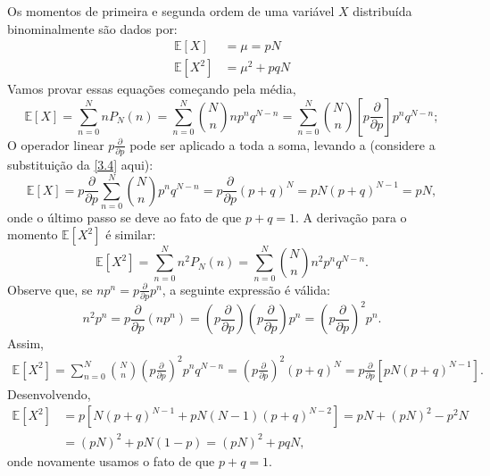 Os momentos de primeira e segunda ordem de uma variável $X$ distribuída binominalmente são dados por:
\begin{subequations}\label{3.6}
\begin{align}
\mathbb{E}[X] &= \mu = pN \label{3.6a}\\
\mathbb{E}[X^2] &= \mu^2 + pqN 
\end{align}
\end{subequations}
Vamos provar essas equações começando pela média,
\begin{equation*}
\mathbb{E}[X] = \sum_{n=0}^{N} n P_N(n) = \sum_{n=0}^{N} \binom{N}{n} n p^n q^{N-n} = \sum_{n=0}^{N}  \binom{N}{n} \left[p \dfrac{\partial}{\partial p}\right]p^n q^{N-n};
\end{equation*}
O operador linear $p\frac{\partial}{\partial p}$ pode ser aplicado a toda a soma, levando a (considere a substituição da \autoref{3.4} aqui):
\begin{equation*}
\mathbb{E}[X] = p \dfrac{\partial}{\partial p} \sum_{n=0}^{N} \binom{N}{n} p^n q^{N-n} = p \dfrac{\partial}{\partial p} (p + q)^N = pN(p + q)^{N-1} = pN,
\end{equation*}
onde o último passo se deve ao fato de que $p + q = 1$. A derivação para o momento $\mathbb{E}[X^2]$ é similar:
\begin{equation*}
\mathbb{E}[X^2] = \sum_{n=0}^{N} n^2 P_N(n) = \sum_{n=0}^{N} \binom{N}{n} n^2p^n q^{N-n}.
\end{equation*}
Observe que, se $np^n = p\frac{\partial}{\partial p}p^n$, a seguinte expressão é válida:
\begin{equation*}
n^2p^n = p\frac{\partial}{\partial p} \left(np^n\right) = \left(p\frac{\partial}{\partial p}\right)\left(p\frac{\partial}{\partial p}\right)p^n = \left(p\frac{\partial}{\partial p}\right)^2p^n.
\end{equation*}
Assim, 
\begin{align*}
\mathbb{E}[X^2] = \sum_{n=0}^{N} \binom{N}{n} \left(p\frac{\partial}{\partial p}\right)^2 p^nq^{N-n} =  \left(p\frac{\partial}{\partial p}\right)^2 (p + q)^N = p\frac{\partial}{\partial p} \left[pN (p + q)^{N -1}\right].
\end{align*}
Desenvolvendo, 
\begin{align*}
\mathbb{E}[X^2] &= p\left[N(p + q)^{N -1} + pN(N - 1)(p + q)^{N - 2}\right] = pN + (pN)^2 - p^2N \\
&= (pN)^2 + pN(1 - p) = (pN)^2 + pqN,
\end{align*}
onde novamente usamos o fato de que $p + q = 1$. 

